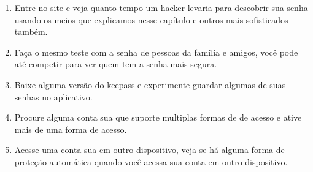 \begin{enumerate}
\item Entre no site \href{https://www.security.org/how-secure-is-my-password/} e veja quanto tempo um hacker levaria para descobrir sua senha usando os meios que explicamos nesse capítulo e outros mais sofisticados também.
\item Faça o mesmo teste com a senha de pessoas da família e amigos, você pode até competir para ver quem tem a senha mais segura.
\item Baixe alguma versão do keepass e experimente guardar algumas de suas senhas no aplicativo.
\item Procure alguma conta sua que suporte multiplas formas de de acesso e ative mais de uma forma de acesso.
\item Acesse uma conta sua  em outro dispositivo, veja se há alguma forma de proteção automática quando você acessa sua conta em outro dispositivo.
\end{enumerate}
